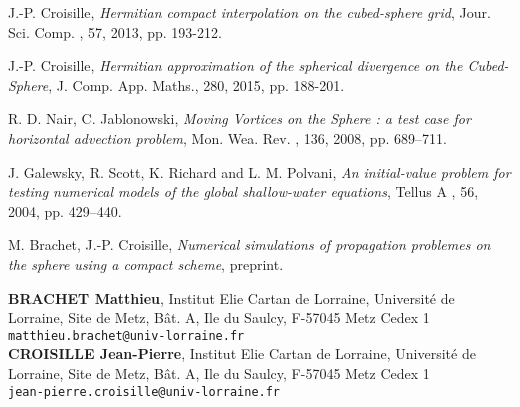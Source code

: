 \documentclass[10pt]{article}
\def\auteurenbasdepage#1#2#3{\small{\bf #1}, \small{#2}\\ \small{\tt #3}\\ }
\begin{document}

\begin{thebibliography}{99}

 {\sc J.-P. Croisille}, {\sl Hermitian compact interpolation on the cubed-sphere grid}, Jour. Sci. Comp. , 57, 2013, pp. 193-212.

 {\sc J.-P. Croisille}, {\sl Hermitian approximation of the spherical divergence on the Cubed-Sphere}, J. Comp. App. Maths., 280, 2015, pp. 188-201.

 {\sc R. D. Nair, C. Jablonowski}, {\sl Moving Vortices on the Sphere : a test case for horizontal advection problem}, Mon. Wea. Rev. , 136, 2008, pp. 689--711.

 {\sc J. Galewsky, R. Scott, K. Richard and L. M. Polvani}, {\sl An initial-value problem for testing numerical models of the global shallow-water equations}, Tellus A , 56, 2004, pp. 429--440.

 {\sc M. Brachet, J.-P. Croisille}, {\sl Numerical simulations of propagation problemes
on the sphere using a compact scheme}, preprint.

\end{thebibliography}

\vfill
\auteurenbasdepage{BRACHET Matthieu}{Institut Elie Cartan de Lorraine, Universit\'e de Lorraine,
Site de Metz, B\^at.  A, Ile du Saulcy, F-57045 Metz Cedex 1}{matthieu.brachet@univ-lorraine.fr}
\auteurenbasdepage{CROISILLE Jean-Pierre}{Institut Elie Cartan de Lorraine, Universit\'e de Lorraine,
Site de Metz, B\^at.  A, Ile du Saulcy, F-57045 Metz Cedex 1}{jean-pierre.croisille@univ-lorraine.fr}
\end{document}
